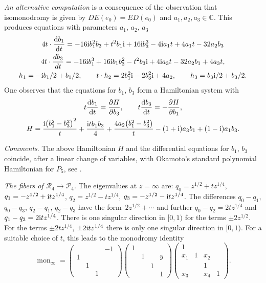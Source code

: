 \documentclass[10pt,a4paper]{amsart}
\numberwithin{equation}{section}
\begin{document}
{\it An alternative computation} is a consequence of the observation that isomonodromy is given by
 $ DE(e_0)=ED(e_0)$ and $a_1,a_2,a_3 \in \mathbb{C}$. This produces equations with
 parameters $a_1$, $a_2$, $a_3$
 \begin{gather*}
 4t\cdot \frac{{\rm d}b_1}{{\rm d}t} = -16{\rm i}b_1^2b_3 + t^2b_1{\rm i} + 16{\rm i}b_3^3 - 4{\rm i}a_1t + 4a_1t - 32a_2b_3\\
 4t\cdot \frac{db_3}{dt} = -16{\rm i}b_1^3 + 16{\rm i}b_1b_3^2 - t^2b_3{\rm i} + 4{\rm i}a_3t - 32a_2b_1 + 4a_3t,\\
 h_1 = -{\rm i}b_1/2 + b_1/2, \qquad t\cdot h_2 = 2b_1^2{\rm i} - 2b_3^2{\rm i} + 4a_2,\qquad h_3 = b_3{\rm i}/2 + b_3/2. \end{gather*}
 One observes that the equations for $b_1$, $b_3$ form a Hamiltonian system with
 \begin{gather*}
 t\frac{{\rm d}b_1}{{\rm d}t}=\frac{\partial H}{\partial b_3},\qquad t\frac{{\rm d}b_3}{{\rm d}t}=-\frac{\partial H }{\partial b_1},\\
H=\frac{{\rm i}\bigl(b_1^2-b_3^2\bigr)^2}{t}+\frac{{\rm i}tb_1b_3}{4}+\frac{4a_2\bigl(b_1^2-b_3^2\bigr)}{t}-(1+{\rm i})a_3b_1+(1-{\rm i})a_1b_3.\end{gather*}

{\it Comments}.
The above Hamiltonian $H$ and the differential equations for $b_1$, $b_3$ coincide, after a linear change of variables,
with Okamoto's standard polynomial Hamiltonian for $P_5$, see \cite[p.~265]{O1}.


{\it The fibers of $\mathcal{R}_4\rightarrow \mathcal{P}_4$}. The eigenvalues at $z=\infty$ are:
$q_0=z^{1/2}+tz^{1/4}$, $q_1=-z^{1/2}+{\rm i}tz^{1/4}$, $q_2=z^{1/2}-tz^{1/4}$, $q_3=-z^{1/2}-{\rm i}tz^{1/4}$.
 The differences $q_0-q_1$, $ q_0-q_3$, $ q_2-q_1$, $ q_2-q_3$ have the form~${2z^{1/2}+\cdots}$ and further
 $q_0-q_2=2tz^{1/4}$ and $q_1-q_3=2{\rm i}tz^{1/4}$. There is one singular direction in $[0,1)$ for the terms
 $\pm 2z^{1/2}$. For the terms $\pm 2tz^{1/4}$, $\pm 2{\rm i}tz^{1/4}$ there is only one singular direction in $[0,1)$.
 For a suitable choice of $t$, this leads to the monodromy identity
 \[\operatorname{mon}_\infty= \begin{pmatrix} & & &-1 \\ 1& & & \\ & 1& & \\ & &1 & \end{pmatrix} \begin{pmatrix} 1 & & & \\ & 1& &y \\ & &1 & \\ & & & 1\end{pmatrix}
\begin{pmatrix} 1 & & & \\ x_1&1 &x_2 & \\ & & 1& \\ x_3& &x_4 & 1\end{pmatrix}. \]
\end{document}
